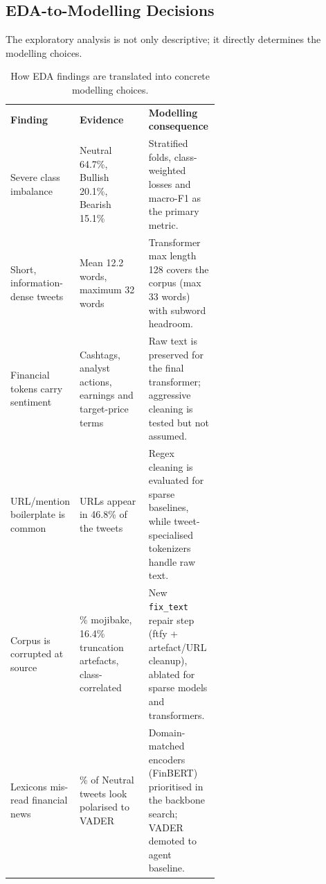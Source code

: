 \documentclass[11pt,a4paper]{article}
\newcommand{\tH}[1]{\textcolor{maincolor}{\textbf{#1}}}
\newcommand{\gmid}{\arrayrulecolor{maincolor}\midrule\arrayrulecolor{black}}
\begin{document}
\subsection{EDA-to-Modelling Decisions}
The exploratory analysis is not only descriptive; it directly determines the modelling choices.
\begin{table}[H]
  \centering
  \scriptsize
  \setlength{\tabcolsep}{5pt}
  \begin{tabularx}{\linewidth}{@{}>{\raggedright\arraybackslash}p{0.27\linewidth}
                                >{\raggedright\arraybackslash}p{0.33\linewidth}
                                >{\raggedright\arraybackslash}X@{}}
    \toprule
    \tH{Finding} & \tH{Evidence} & \tH{Modelling consequence} \\
    \gmid
    Severe class imbalance & Neutral 64.7\%, Bullish 20.1\%, Bearish 15.1\% &
    Stratified folds, class-weighted losses and macro-F1 as the primary metric. \\
    Short, information-dense tweets & Mean 12.2 words, maximum 32 words &
    Transformer max length 128 covers the corpus (max 33 words) with subword headroom. \\
    Financial tokens carry sentiment & Cashtags, analyst actions, earnings and target-price terms &
    Raw text is preserved for the final transformer; aggressive cleaning is tested but not assumed. \\
    URL/mention boilerplate is common & URLs appear in 46.8\% of the tweets &
    Regex cleaning is evaluated for sparse baselines, while tweet-specialised tokenizers handle raw text. \\
    Corpus is corrupted at source & 7.0\% mojibake, 16.4\% truncation artefacts, class-correlated &
    New \texttt{fix\_text} repair step (ftfy + artefact/URL cleanup), ablated for sparse models and transformers. \\
    Lexicons mis-read financial news & 50.6\% of Neutral tweets look polarised to VADER &
    Domain-matched encoders (FinBERT) prioritised in the backbone search; VADER demoted to agent baseline. \\
    \bottomrule
  \end{tabularx}
  \caption{How EDA findings are translated into concrete modelling choices.}
  \label{tab:eda_decisions}
\end{table}
\end{document}
